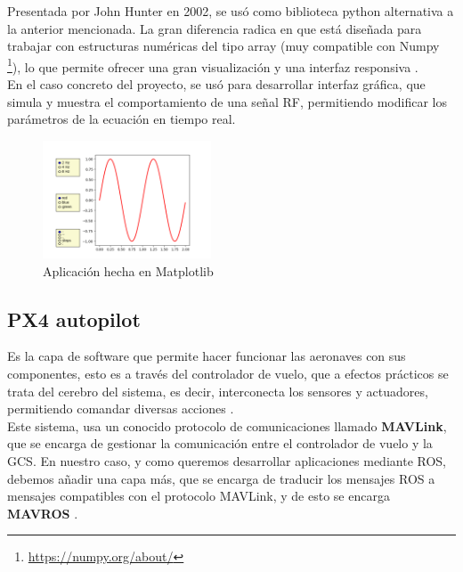 Presentada por John Hunter en 2002, se usó como biblioteca python alternativa a la anterior mencionada. La gran diferencia radica en que está diseñada para trabajar con estructuras numéricas del tipo array (muy compatible con Numpy \footnote{\url{https://numpy.org/about/}}), lo que permite ofrecer una gran visualización y una interfaz responsiva \cite{matplotlib-def}.\\

En el caso concreto del proyecto, se usó para desarrollar interfaz gráfica, que simula y muestra el comportamiento de una señal \ac{RF}, permitiendo modificar los parámetros de la ecuación en tiempo real.\\

\begin{figure} [H]
	\begin{center}
	\includegraphics[height=3.5cm]{imagenes/cap3/6_matplotlib_app.png}
	\end{center}
	\caption[Aplicación hecha en Matplotlib]{Aplicación hecha en Matplotlib}
	\label{fig:matplotlib}
\end{figure}

\subsection{PX4 autopilot}
\label{subsec:px4}

Es la capa de software que permite hacer funcionar las aeronaves con sus componentes, esto es a través del controlador de vuelo, que a efectos prácticos se trata del cerebro del sistema, es decir, interconecta los sensores y actuadores, permitiendo comandar diversas acciones \cite{flight-controller} \cite{px4-def}.\\

Este sistema, usa un conocido protocolo de comunicaciones llamado \textbf{MAVLink}, que se encarga de gestionar la comunicación entre el controlador de vuelo y la \ac{GCS}. En nuestro caso, y como queremos desarrollar aplicaciones mediante \ac{ROS}, debemos añadir una capa más, que se encarga de traducir los mensajes ROS a mensajes compatibles con el protocolo MAVLink, y de esto se encarga \textbf{MAVROS} \cite{px4-mavlink} \cite{px4-mavros}.\\

